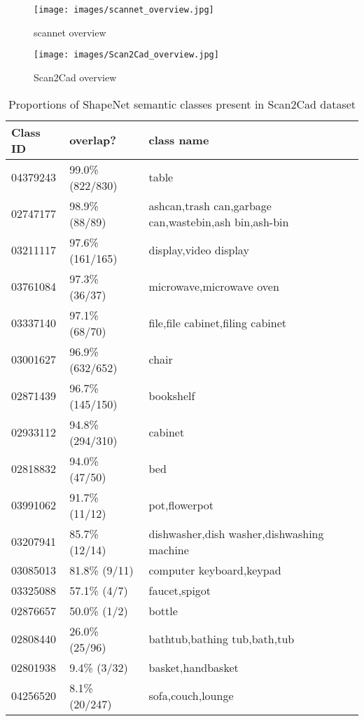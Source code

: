 \begin{figure}[!htb]
\label{fig:scannet_overview}
  \centering
\texttt{[image: images/scannet\_overview.jpg]}
\caption{scannet overview}
\end{figure}

\begin{figure}[!htb]
\label{fig:Scan2Cad_overview}
\centering
\texttt{[image: images/Scan2Cad\_overview.jpg]}
\caption{Scan2Cad overview}
\end{figure}



\begin{table}[]
\caption{Proportions of ShapeNet semantic classes present in Scan2Cad dataset}
\label{table:scan2part_proportions}
\begin{tabular}{l|l|l}
Class ID & overlap? & class name \\
\hline
04379243 & 99.0\% (822/830) & table \\ \hline
02747177 & 98.9\% (88/89) & ashcan,trash can,garbage can,wastebin,ash bin,ash-bin \\ \hline
03211117 & 97.6\% (161/165) & display,video display \\ \hline
03761084 & 97.3\% (36/37) & microwave,microwave oven \\ \hline
03337140 & 97.1\% (68/70) & file,file cabinet,filing cabinet \\ \hline
03001627 & 96.9\% (632/652) & chair \\ \hline
02871439 & 96.7\% (145/150) & bookshelf \\ \hline
02933112 & 94.8\% (294/310) & cabinet \\ \hline
02818832 & 94.0\% (47/50) & bed \\ \hline
03991062 & 91.7\% (11/12) & pot,flowerpot \\ \hline
03207941 & 85.7\% (12/14) & dishwasher,dish washer,dishwashing machine \\ \hline
03085013 & 81.8\% (9/11) & computer keyboard,keypad \\ \hline
03325088 & 57.1\% (4/7) & faucet,spigot \\ \hline
02876657 & 50.0\% (1/2) & bottle \\ \hline
02808440 & 26.0\% (25/96) & bathtub,bathing tub,bath,tub \\ \hline
02801938 & 9.4\% (3/32) & basket,handbasket \\ \hline
04256520 & 8.1\% (20/247) & sofa,couch,lounge \\ \hline

\end{tabular}
\end{table}

